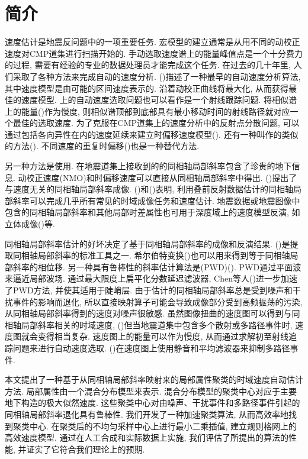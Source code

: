 \section{简介}
速度估计是地震反问题中的一项重要任务. 宏模型的建立通常是从用不同的动校正速度对CMP道集进行扫描开始的. 手动选取速度谱上的能量峰值点是一个十分费力的过程, 需要有经验的专业的数据处理员才能完成这个任务. 在过去的几十年里, 人们采取了各种方法来完成自动的速度分析. (\cite{Toldi1989})描述了一种最早的自动速度分析算法, 其中速度模型是由可能的区间速度表示的. 沿着动校正曲线将最大化, 从而获得最佳的速度模型. 上的自动速度选取问题也可以看作是一个射线跟踪问题. 将相似谱上的能量(\cite{Fomel2009})作为慢度, 则相似谱顶部到底部具有最小移动时间的射线路径就对应一个最佳的选取速度. 为了克服在CMP道集上的速度分析中的反射点分散问题, 可以通过包括各向异性在内的速度延续来建立时偏移速度模型(\cite{Adler2002,Fomel2003,Alkhalifah2011,Burnett2011}). 还有一种叫作的类似的方法(\cite{Schleicher2008}). 不同速度的重复时偏移(\cite{Yilmaz2001a})也是一种替代方法. 

另一种方法是使用. 在地震道集上接收到的的同相轴局部斜率包含了珍贵的地下信息. 动校正速度(NMO)和时偏移速度可以直接从同相轴局部斜率中得出. (\cite{Ottolini1983})提出了与速度无关的同相轴局部斜率成像. (\cite{Fomel2007})和(\cite{Cooke2009})表明, 利用叠前反射数据估计的同相轴局部斜率可以完成几乎所有常见的时域成像任务和速度估计. 地震数据或地震图像中包含的同相轴局部斜率和其他局部时差属性也可用于深度域上的速度模型反演, 如立体成像(\cite{Billette1998,Lambare2008})等. 

同相轴局部斜率估计的好坏决定了基于同相轴局部斜率的成像和反演结果. (\cite{Ottolini1983})是提取同相轴局部斜率的标准工具之一. 希尔伯特变换(\cite{Barnes1996,Cooke2009,Zhang2013,Wang2015})也可以用来得到等于同相轴局部斜率的相位移. 另一种具有鲁棒性的斜率估计算法是(PWD)(\cite{Fomel2002, Schleicher2009}). PWD通过平面波来逼近局部波场. 通过最大限度上扁平化分数延迟滤波器, Chen等人(\cite{Chen2013,Chen2013a})进一步加速了PWD方法, 并使其适用于陡峭层. 由于估计的同相轴局部斜率总是受到噪声和干扰事件的影响而退化, 所以直接映射算子可能会导致成像部分受到高频振荡的污染, 从同相轴局部斜率得到的速度对噪声很敏感. 虽然图像扭曲的速度图可以得到与同相轴局部斜率相关的时域速度, (\cite{Fomel2007})但当地震道集中包含多个散射或多路径事件时, 速度图就会变得相当复杂. 速度图上的能量可以作为慢度, 从而通过求解初至射线追踪问题来进行自动速度选取. (\cite{Cooke2009})在速度图上使用静音和平均滤波器来抑制多路径事件. 

本文提出了一种基于从同相轴局部斜率映射来的局部属性聚类的时域速度自动估计方法. 局部属性由一个混合分布模型来表示. 混合分布模型的聚类中心对应于主要地下构造的极大似然速度. 这些聚类中心对由噪声、干扰事件和多路径事件引起的同相轴局部斜率退化具有鲁棒性. 我们开发了一种加速聚类算法, 从而高效率地找到聚类中心. 在聚类后的不均匀采样中心上进行最小二乘插值, 建立规则格网上的高效速度模型. 通过在人工合成和实际数据上实施, 我们评估了所提出的算法的性能, 并证实了它符合我们理论上的预期. 
